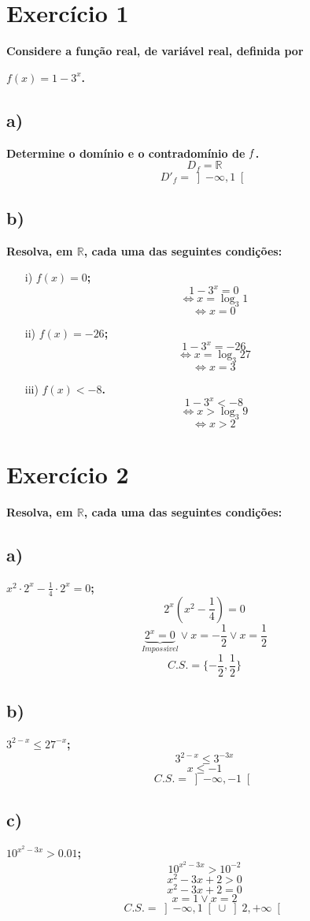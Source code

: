 \documentclass[a4paper]{article}
\begin{document}
	\section*{Exercício 1}\textbf{Considere a função real, de variável real, definida por}

	\begin{center}
		\textbf{$f(x) = 1 - 3^x$.}
	\end{center}
	\subsection*{a)}\textbf{Determine o domínio e o contradomínio de $\it{f}$.}
	\[D_{f}=\mathbb{R}\]
	\[D'_{f}= \left]-\infty,1\right[\]
	\subsection*{b)}\textbf{Resolva, em $\mathbb{R}$, cada uma das seguintes condições:}
	\begin{itemize}
		\item[i)] \textbf{$f(x)=0$;}
		\[1-3^x=0\]
		\[\Leftrightarrow x=\log_{3}{1}\]
		\[\Leftrightarrow x=0\]
		\item[ii)] \textbf{$f(x)=-26$;}
		\[1-3^x=-26\]
		\[\Leftrightarrow x=\log_{3}{27}\]
		\[\Leftrightarrow x=3\]
		\item[iii)] \textbf{$f(x)<-8$.}
		\[1-3^x<-8\]
		\[\Leftrightarrow x>\log_{3}{9}\]
		\[\Leftrightarrow x>2\]
	\end{itemize}
	\section*{Exercício 2}\textbf{Resolva, em $\mathbb{R}$, cada uma das seguintes condições:}
	
	\subsection*{a)} \textbf{$x^2 \cdot 2^x - \frac{1}{4} \cdot 2^x =0$;}
	\[2^x\left(x^2-\frac{1}{4}\right)=0\]
	\[\underbrace{2^x=0}_{Impossível} \lor x=-\frac{1}{2} \lor x=\frac{1}{2}\]
	\[C.S.=\{-\frac{1}{2},\frac{1}{2}\}\]
	\subsection*{b)} \textbf{$3^{2-x} \leq 27^{-x}$;}
	\[3^{2-x} \leq 3^{-3x}\]
	\[x \leq -1\]
	\[C.S.=\left]-\infty,-1\right[\]
	
\subsection*{c)} \textbf{$10^{x^2-3x} > 0.01$;}
\[10^{x^2-3x} > 10^{-2}\]
\[x^2-3x + 2 > 0\]
\[x^2-3x + 2=0\]
\[x =1 \lor x=2\]
\[C.S.=\left]-\infty,1\right[\cup\left]2,+\infty\right[\]
\end{document}
